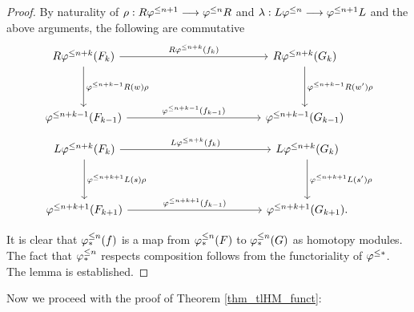 \begin{proof}
By naturality of $\rho : R\varphi^{\leq n + 1} \longrightarrow \varphi^{\leq n} R$ and 
$\lambda: L\varphi^{\leq n} \longrightarrow \varphi^{\leq n + 1}L$ and the above arguments, 
the following are commutative
\[
\begin{tikzcd}[column sep=12em, row sep=huge]
R\tlHI{n + k}(F_k) \arrow{r}{R \tlHI{n + k}(f_k)} 
   \arrow{d}{\tlHI{n + k - 1}R(\deloop) \rho} &
R\tlHI{n + k}(G_k) 
   \arrow{d}{\tlHI{n + k - 1}R(\deloop') \rho} \\
\tlHI{n + k - 1}(F_{k - 1}) 
   \arrow{r}{\tlHI{n + k - 1}(f_{k - 1})} &
\tlHI{n + k - 1}(G_{k - 1}) 
\end{tikzcd}
\]
\[
\begin{tikzcd}[column sep=12em, row sep=huge]
L\tlHI{n + k}(F_k) \arrow{r}{L \tlHI{n + k}(f_k)} 
   \arrow{d}{\tlHI{n + k + 1}L(\susp) \rho} &
L\tlHI{n + k}(G_k) 
   \arrow{d}{\tlHI{n + k + 1}L(\susp') \rho} \\
\tlHI{n + k + 1}(F_{k + 1}) 
   \arrow{r}{\tlHI{n + k + 1}(f_{k - 1})} &
\tlHI{n + k + 1}(G_{k + 1}).
\end{tikzcd}
\]

It is clear that $\varphi^{\leq n}_{*}(f)$ is a map from $\varphi^{\leq n}_{*}(F)$ to 
$\varphi^{\leq n}_{*}(G)$ as homotopy modules. The fact that $\varphi^{\leq n}_{*}$ 
respects composition follows from the functoriality of $\varphi^{\leq *}$.
The lemma is established.
\end{proof}

Now we proceed with the proof of Theorem \ref{thm_tlHM_funct}:

